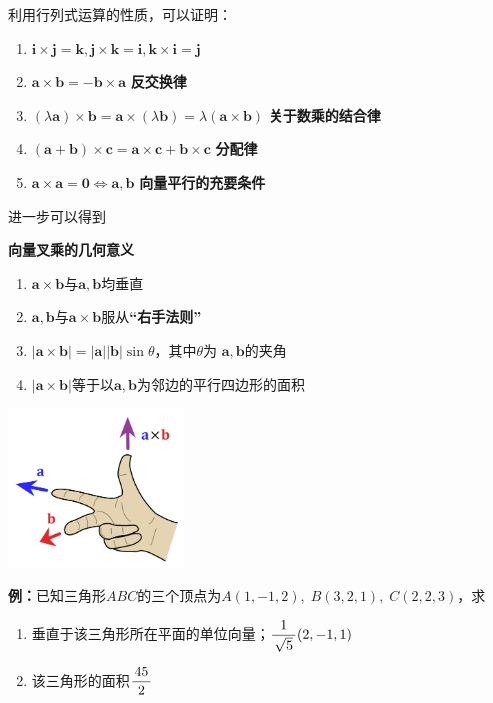 利用行列式运算的性质，可以证明：
\begin{thx}
	\begin{enumerate}
	  \item $\bm{i}\times\bm{j}=\bm{k},\bm{j}\times\bm{k}=\bm{i},
		\bm{k}\times\bm{i}=\bm{j}$
	  \item $\bm{a}\times\bm{b}=-\bm{b}\times\bm{a}$
	  \hfill {\bf 反交换律}
	  \item 
	  $(\lambda\bm{a})\times\bm{b}=\bm{a}\times(\lambda\bm{b})
	  =\lambda(\bm{a}\times\bm{b})$
	  \hfill {\bf 关于数乘的结合律}
	  \item 
	  $(\bm{a}+\bm{b})\times\bm{c}=\bm{a}\times\bm{c}+\bm{b}\times\bm{c}$
	  \hfill {\bf 分配律}
	  \item $\bm{a}\times\bm{a}=\bm{0}\Leftrightarrow\bm{a},\bm{b}$
	  \hfill {\bf 向量平行的充要条件}
	\end{enumerate}
\end{thx}

进一步可以得到
\begin{thx}
	{\bf 向量叉乘的几何意义}
	\begin{enumerate}%
	  \item $\bm{a}\times\bm{b}$与$\bm{a},\bm{b}$均垂直
	  \item $\bm{a},\bm{b}$与$\bm{a}\times\bm{b}$服从{\bf “右手法则”}
	  \item $|\bm{a}\times\bm{b}|=|\bm{a}||\bm{b}|\sin\theta$，其中$\theta$为
	  $\bm{a},\bm{b}$的夹角
	  \item $|\bm{a}\times\bm{b}|$等于以$\bm{a},\bm{b}$为邻边的平行四边形的面积
	\end{enumerate}
	\begin{center}
		\includegraphics[width=0.35\textwidth]{./images/ch8/Right_hand_rule_cross_product.png}
	\end{center}
\end{thx}

{\bf 例：}已知三角形$ABC$的三个顶点为$A(1,-1,2),\;B(3,2,1),\;C(2,2,3)$，求
\begin{enumerate}[(1)]
  \setlength{\itemindent}{1cm}
  \item 垂直于该三角形所在平面的单位向量；\hfill $\displaystyle\frac{\,{1}\,}{\,{\sqrt5}\,}(2,-1,1)$
  \item 该三角形的面积\hfill $\displaystyle\frac{\,{45}\,}{\,{2}\,}$
\end{enumerate}


